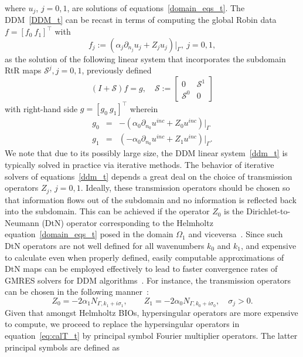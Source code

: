 \documentclass[11pt]{article}
\numberwithin{equation}{section}
\begin{document}
 where $u_j$, $j=0,1$, are solutions of equations~\eqref{domain_eqs_t}. The DDM~\eqref{DDM_t} can be recast in terms of computing the global Robin data $f=[f_0\ f_1]^\top$ with
\[
f_{j}:=(\alpha_j\partial_{n_j}u_j+Z_j u_j)|_{\Gamma},\ j=0,1,
\]
as the solution of the following linear system that incorporates the subdomain RtR maps $\mathcal{S}^j,j=0,1$, previously defined
\begin{equation}\label{ddm_t}
 (I+\mathcal{S})f=g,\quad \mathcal{S}:=\begin{bmatrix}0&\mathcal{S}^1\\\mathcal{S}^0&0\end{bmatrix}
 \end{equation}
with right-hand side $g=[g_0\ g_1]^\top$ wherein
 \begin{eqnarray}\label{rhs_ddm_t}
   g_0&=& -(\alpha_0\partial_{n_0}u^{inc}+Z_0u^{inc})|_{\Gamma}\nonumber\\
   g_1&=&(-\alpha_0\partial_{n_0}u^{inc}+Z_1u^{inc})|_{\Gamma}.\nonumber
   \end{eqnarray}
 We note that due to its possibly large size, the DDM linear system~\eqref{ddm_t} is typically solved in practice via iterative methods. The behavior of iterative solvers of equations~\eqref{ddm_t} depends a great deal on the choice of transmission operators $Z_j$, $j=0,1$. Ideally, these transmission operators should be chosen so that information flows out of the subdomain and no information is reflected back into the subdomain. This can be achieved if the operator $Z_0$ is the Dirichlet-to-Neumann (DtN) operator corresponding to the Helmholtz equation~\eqref{domain_eqs_t} posed in the domain $\Omega_1$ and viceversa~\cite{Nataf,HJP13}. Since such DtN operators are not well defined for all wavenumbers $k_0$ and $k_1$, and expensive to calculate even when properly defined, easily computable approximations of DtN maps can be employed effectively to lead to faster convergence rates of GMRES solvers for DDM algorithms~\cite{boubendirDDM}. For instance, the transmission operators can be chosen in the following manner~\cite{turc2016well}:
 \begin{equation}\label{eq:calT_t}
 Z_0=-2\alpha_1N_{\Gamma,k_1+i\sigma_1},\qquad Z_1 = -2\alpha_0N_{\Gamma,k_0+i\sigma_0},\quad \sigma_j>0.
 \end{equation}
 Given that amongst Helmholtz BIOs, hypersingular operators are more expensive to compute, we proceed to replace the hypersingular operators in equation~\eqref{eq:calT_t} by principal symbol Fourier multiplier operators. The latter principal symbols are defined as
\end{document}
